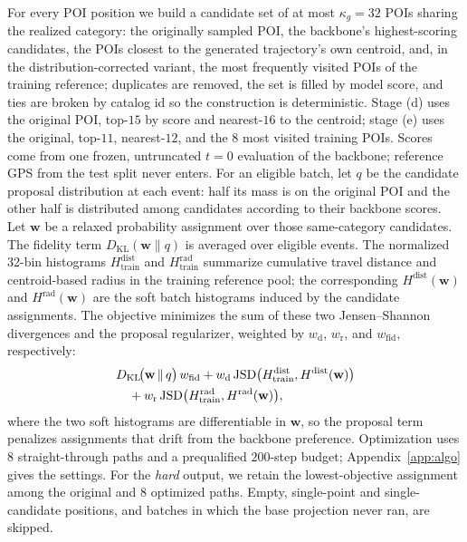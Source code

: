 For every POI position we build a candidate set of at most $\kappa_g{=}32$ POIs sharing
the realized category: the originally sampled POI, the backbone's highest-scoring
candidates, the POIs closest to the generated trajectory's own centroid, and, in the
distribution-corrected variant, the most frequently visited POIs of the training
reference; duplicates are removed, the set is filled by model score, and ties are broken
by catalog id so the construction is deterministic. Stage (d) uses the original
POI, top-$15$ by score and nearest-$16$ to the centroid; stage (e) uses the original,
top-$11$, nearest-$12$, and the $8$ most visited training POIs. Scores come from one frozen,
untruncated $t{=}0$ evaluation of the backbone; reference GPS from the test split never
enters. For an eligible batch, let $q$ be the candidate proposal distribution at each
event: half its mass is on the original POI and the other half is distributed among
candidates according to their backbone scores. Let $\mathbf{w}$ be a relaxed
probability assignment over those same-category candidates. The fidelity term
$D_{\mathrm{KL}}(\mathbf{w}\|q)$ is averaged over eligible events. The normalized
32-bin histograms $H^{\mathrm{dist}}_{\mathrm{train}}$ and
$H^{\mathrm{rad}}_{\mathrm{train}}$ summarize cumulative travel distance and
centroid-based radius in the training reference pool; the corresponding
$H^{\mathrm{dist}}(\mathbf{w})$ and $H^{\mathrm{rad}}(\mathbf{w})$ are the soft
batch histograms induced by the candidate assignments. The objective minimizes
the sum of these two Jensen--Shannon divergences and the proposal regularizer,
weighted by $w_{\mathrm{d}}$, $w_{\mathrm{r}}$, and $w_{\mathrm{fid}}$,
respectively:
\begin{equation}
\begin{aligned}
  &D_{\mathrm{KL}}\!\big(\mathbf{w}\,\|\,q\big)\,w_{\mathrm{fid}}
  + w_{\mathrm{d}}\,\mathrm{JSD}\big(H^{\mathrm{dist}}_{\mathrm{train}},H^{\mathrm{dist}}(\mathbf{w})\big)\\
  &\quad + w_{\mathrm{r}}\,\mathrm{JSD}\big(H^{\mathrm{rad}}_{\mathrm{train}},H^{\mathrm{rad}}(\mathbf{w})\big),
\end{aligned}
  \label{eq:geometry}
\end{equation}
where the two soft histograms are differentiable in $\mathbf{w}$, so the proposal
term penalizes assignments that drift from the backbone preference. Optimization
uses $8$ straight-through paths and a
prequalified $200$-step budget; Appendix~\ref{app:algo} gives the settings.
For the \emph{hard} output, we retain the lowest-objective assignment among the
original and $8$ optimized paths.
Empty, single-point and single-candidate positions, and batches in which the base
projection never ran, are skipped.

